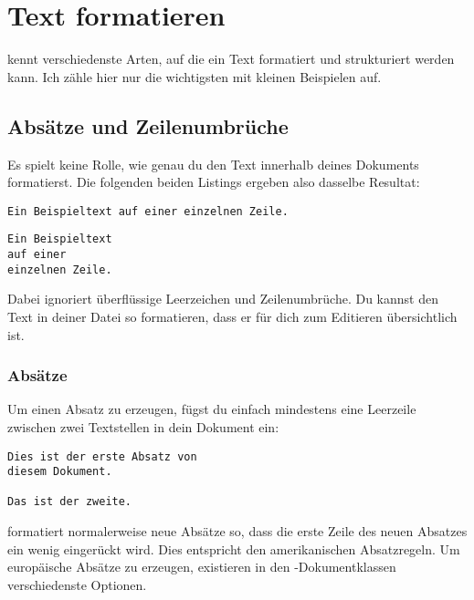 %
%

\chapter{Text formatieren}

\DMLLaTeX{} kennt verschiedenste Arten, auf die ein Text formatiert und strukturiert werden kann. Ich zähle hier nur die wichtigsten mit kleinen Beispielen auf.

\section{Absätze und Zeilenumbrüche}

Es spielt keine Rolle, wie genau du den Text innerhalb deines Dokuments formatierst. Die folgenden beiden Listings ergeben also dasselbe Resultat:
\begin{lstlisting}
Ein Beispieltext auf einer einzelnen Zeile.
\end{lstlisting}

\begin{lstlisting}
Ein Beispieltext
auf einer
einzelnen Zeile.
\end{lstlisting}

Dabei ignoriert \DMLLaTeX{} überflüssige Leerzeichen und Zeilenumbrüche. Du kannst den Text in deiner Datei so formatieren, dass er für dich zum Editieren übersichtlich ist.

\subsection{Absätze}

Um einen Absatz zu erzeugen, fügst du einfach mindestens eine Leerzeile zwischen zwei Textstellen in dein Dokument ein:
\begin{lstlisting}
Dies ist der erste Absatz von
diesem Dokument.

Das ist der zweite.
\end{lstlisting}

\DMLLaTeX{} formatiert normalerweise neue Absätze so, dass die erste Zeile des neuen Absatzes ein wenig eingerückt wird. Dies entspricht den amerikanischen Absatzregeln. Um europäische Absätze zu erzeugen, existieren in den \KOMAScript-Dokumentklassen verschiedenste Optionen.

